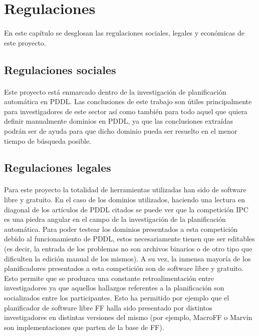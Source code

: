 \documentclass{article}
\author{Adrián Gil Moral }
\begin{document}
\section{Regulaciones}

\paragraph{}
En este capítulo se desglosan las regulaciones sociales, legales y económicas de este proyecto.

\subsection{Regulaciones sociales}
\paragraph{}
Este proyecto está enmarcado dentro de la investigación de planificación automática en PDDL. Las conclusiones de este trabajo son útiles principalmente para investigadores de este sector así como también para todo aquel que quiera definir manualmente dominios en PDDL, ya que las conclusiones extraídas podrán ser de ayuda para que dicho dominio pueda ser resuelto en el menor tiempo de búsqueda posible.

\subsection{Regulaciones legales}
\paragraph{}
Para este proyecto la totalidad de herramientas utilizadas han sido de software libre y gratuito. En el caso de los dominios utilizados, haciendo una lectura en diagonal de los artículos de PDDL citados se puede ver que la competición IPC es una piedra angular en el campo de la investigación de la planificación automática. Para poder testear los dominios presentados a esta competición debido al funcionamiento de PDDL, estos necesariamente tienen que ser editables (es decir, la entrada de los problemas no son archivos binarios o de otro tipo que dificulten la edición manual de los mismos). A su vez, la inmensa mayoría  de los planificadores presentados a esta competición son de software libre y gratuito. Esto permite que se produzca una constante retroalimentación entre investigadores ya que aquellos hallazgos referentes a la planificación son socializados entre los participantes. Esto ha permitido por ejemplo que el planificador de software libre FF halla sido presentado por distintos investigadores en distintas versiones del mismo (por ejemplo, MacroFF o Marvin son implementaciones que parten de la base de FF).
\end{document}
